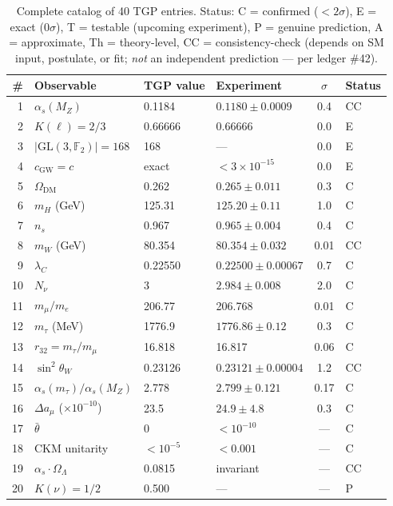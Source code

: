 \documentclass[aps,prd,twocolumn,superscriptaddress,showpacs,
  nofootinbib,floatfix,longbibliography]{revtex4-2}
\newcommand{\OL}{\Omega_\Lambda}
\newcommand{\GL}{\mathrm{GL}(3,\mathbb{F}_2)}
\newcommand{\as}{\alpha_s}
\newcommand{\MZ}{M_Z}
\begin{document}
\begin{table}[tp]
\caption{Complete catalog of 40 TGP entries.
  Status: C = confirmed ($< 2\sigma$), E = exact ($0\sigma$),
  T = testable (upcoming experiment), P = genuine prediction,
  A = approximate, Th = theory-level,
  CC = consistency-check (depends on SM input, postulate, or fit;
  \emph{not} an independent prediction --- per ledger \#42).}\label{tab:all-predictions}
\footnotesize
\begin{ruledtabular}
\begin{tabular}{rlllcl}
\# & Observable & TGP value & Experiment & $\sigma$ & Status \\
\hline
1 & $\as(\MZ)$ & 0.1184 & $0.1180 \pm 0.0009$ & 0.4 & CC \\
2 & $K(\ell) = 2/3$ & 0.66666 & 0.66666 & 0.0 & E \\
3 & $|\GL| = 168$ & 168 & --- & 0.0 & E \\
4 & $c_\mathrm{GW} = c$ & exact & $< 3\!\times\!10^{-15}$ & 0.0 & E \\
5 & $\Omega_\mathrm{DM}$ & 0.262 & $0.265 \pm 0.011$ & 0.3 & C \\
6 & $m_H$ (GeV) & 125.31 & $125.20 \pm 0.11$ & 1.0 & C \\
7 & $n_s$ & 0.967 & $0.965 \pm 0.004$ & 0.4 & C \\
8 & $m_W$ (GeV) & 80.354 & $80.354 \pm 0.032$ & 0.01 & CC \\
9 & $\lambda_C$ & 0.22550 & $0.22500 \pm 0.00067$ & 0.7 & C \\
10 & $N_\nu$ & 3 & $2.984 \pm 0.008$ & 2.0 & C \\
11 & $m_\mu/m_e$ & 206.77 & 206.768 & 0.01 & C \\
12 & $m_\tau$ (MeV) & 1776.9 & $1776.86 \pm 0.12$ & 0.3 & C \\
13 & $r_{32} = m_\tau/m_\mu$ & 16.818 & 16.817 & 0.06 & C \\
14 & $\sin^2\theta_W$ & 0.23126 & $0.23121 \pm 0.00004$ & 1.2 & CC \\
15 & $\as(m_\tau)/\as(\MZ)$ & 2.778 & $2.799 \pm 0.121$ & 0.17 & C \\
16 & $\Delta a_\mu$ ($\times 10^{-10}$) & 23.5 & $24.9 \pm 4.8$ & 0.3 & C \\
17 & $\bar\theta$ & 0 & $< 10^{-10}$ & --- & C \\
18 & CKM unitarity & $< 10^{-5}$ & $< 0.001$ & --- & C \\
19 & $\as \cdot \OL$ & 0.0815 & invariant & --- & CC \\
20 & $K(\nu) = 1/2$ & 0.500 & --- & --- & P \\

\end{tabular}
\end{ruledtabular}
\end{table}
\end{document}
